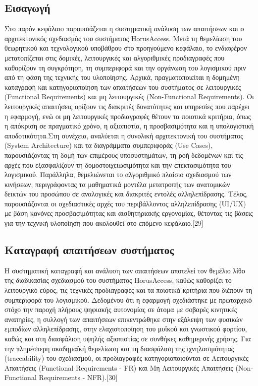 \documentclass[twoside, a4paper, 11pt]{article}
\begin{document}
\subsection{Εισαγωγή}
​Στο παρόν κεφάλαιο παρουσιάζεται η συστηματική ανάλυση των απαιτήσεων και ο αρχιτεκτονικός σχεδιασμός του συστήματος HorusAccess. Μετά τη θεμελίωση του θεωρητικού και τεχνολογικού υποβάθρου στο προηγούμενο κεφάλαιο, το ενδιαφέρον μετατοπίζεται στις δομικές, λειτουργικές και αλγοριθμικές προδιαγραφές που καθορίζουν τη συγκρότηση, τη συμπεριφορά και την οργάνωση του λογισμικού πριν από τη φάση της τεχνικής του υλοποίησης.
​Αρχικά, πραγματοποιείται η δομημένη καταγραφή και κατηγοριοποίηση των απαιτήσεων του συστήματος σε λειτουργικές (Functional Requirements) και μη λειτουργικές (Non-Functional Requirements). Οι λειτουργικές απαιτήσεις ορίζουν τις διακριτές δυνατότητες και υπηρεσίες που παρέχει η εφαρμογή, ενώ οι μη λειτουργικές προδιαγραφές θέτουν τα ποιοτικά κριτήρια, όπως η απόκριση σε πραγματικό χρόνο, η αξιοπιστία, η προσβασιμότητα και η υπολογιστική αποδοτικότητα.
​Στη συνέχεια, αναλύεται η συνολική αρχιτεκτονική του συστήματος (System Architecture) και τα διαγράμματα συμπεριφοράς (Use Cases), παρουσιάζοντας τη δομή των επιμέρους υποσυστημάτων, τη ροή δεδομένων και τις αρχές που εξασφαλίζουν τη δομοστοιχειωσιμότητα και την επεκτασιμότητα του λογισμικού. Παράλληλα, θεμελιώνεται το αλγοριθμικό πλαίσιο σχεδιασμού των κινήσεων, περιγράφοντας τα μαθηματικά μοντέλα μετατροπής των ανατομικών δεικτών του προσώπου σε αναλογικές και διακριτές εντολές αλληλεπίδρασης. Τέλος, παρουσιάζονται οι σχεδιαστικές αρχές του περιβάλλοντος αλληλεπίδρασης (UI/UX) με βάση κανόνες προσβασιμότητας και αισθητηριακής εργονομίας, θέτοντας τις βάσεις για την τεχνική υλοποίηση που ακολουθεί στο επόμενο κεφάλαιο.[29]

\subsection{Καταγραφή απαιτήσεων συστήματος}
​Η συστηματική καταγραφή και ανάλυση των απαιτήσεων αποτελεί τον θεμέλιο λίθο της διαδικασίας σχεδιασμού του συστήματος HorusAccess, 
καθώς καθορίζει το λειτουργικό εύρος, τις τεχνικές προδιαγραφές και τα ποιοτικά κριτήρια που διέπουν τη συμπεριφορά του λογισμικού. 
Δεδομένου ότι η εφαρμογή σχεδιάστηκε με πρωταρχικό στόχο την παροχή πλήρους ψηφιακής αυτονομίας σε άτομα με σοβαρές κινητικές αναπηρίες, 
η συλλογή των απαιτήσεων επικεντρώθηκε στην εξάλειψη των φυσικών εμποδίων αλληλεπίδρασης, στην ελαχιστοποίηση του μυϊκού και γνωστικού φορτίου, καθώς και στη διασφάλιση υψηλής αξιοπιστίας σε συνθήκες καθημερινής χρήσης. 
Για την πληρέστερη ακαδημαϊκή θεμελίωση και τη διασφάλιση της ιχνηλασιμότητας (traceability) του σχεδιασμού, οι προδιαγραφές κατηγοριοποιούνται σε Λειτουργικές Απαιτήσεις (Functional Requirements - FR) και Μη Λειτουργικές Απαιτήσεις (Non-Functional Requirements - NFR).[30]
\end{document}
